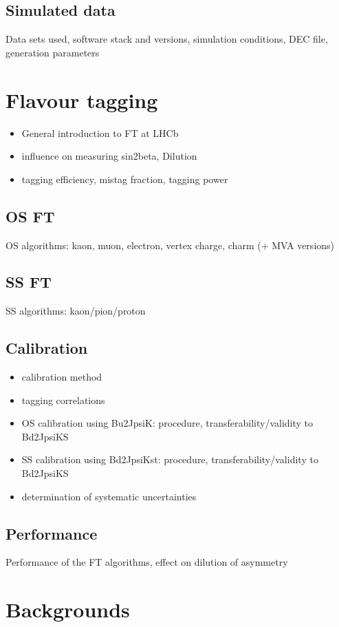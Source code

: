 \subsection{Simulated data}
Data sets used, software stack and versions, simulation conditions, DEC file, generation parameters

\section{Flavour tagging}
\begin{itemize}
  \item General introduction to FT at LHCb
  \item influence on measuring sin2beta, Dilution
  \item tagging efficiency, mistag fraction, tagging power
\end{itemize}

\subsection{OS FT}
OS algorithms: kaon, muon, electron, vertex charge, charm (+ MVA versions)

\subsection{SS FT}
SS algorithms: kaon/pion/proton

\subsection{Calibration}
\begin{itemize}
  \item calibration method
  \item tagging correlations
  \item OS calibration using Bu2JpsiK: procedure, transferability/validity to Bd2JpsiKS
  \item SS calibration using Bd2JpsiKst: procedure, transferability/validity to Bd2JpsiKS
  \item determination of systematic uncertainties
\end{itemize}

\subsection{Performance}
Performance of the FT algorithms, effect on dilution of asymmetry

\section{Backgrounds}
